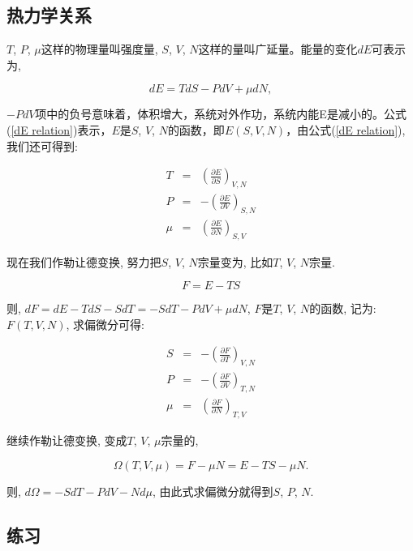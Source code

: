 \subsection{热力学关系}

$T$, $P$, $\mu$这样的物理量叫强度量, $S$, $V$, $N$这样的量叫广延量。能量的变化$dE$可表示为,

\begin{equation}\label{dE relation}
dE = TdS - P dV + \mu dN,
\end{equation}

$-PdV$项中的负号意味着，体积增大，系统对外作功，系统内能E是减小的。公式(\ref{dE relation})表示，$E$是$S$, $V$, $N$的函数，即$E(S, V, N)$，由公式(\ref{dE relation}), 我们还可得到:

\begin{eqnarray*}
  T &=& \left( \frac{\partial E}{\partial S} \right)_{V,N}  \\
  P &=& - \left(\frac{\partial E}{\partial V} \right)_{S,N} \\
  \mu &=& \left(\frac{\partial E}{\partial N} \right)_{S,V}
\end{eqnarray*}

现在我们作勒让德变换, 努力把$S$, $V$, $N$宗量变为, 比如$T$, $V$, $N$宗量.

\begin{equation*}
F = E - TS
\end{equation*}

则, $d F = d E - T dS - S dT = -S dT - P dV + \mu dN$, $F$是$T$, $V$, $N$的函数, 记为: $F(T, V, N)$, 求偏微分可得:

\begin{eqnarray*}
  S &=& - \left( \frac{\partial F}{\partial T} \right)_{V,N} \\
  P &=& - \left( \frac{\partial F}{\partial V} \right)_{T,N} \\
  \mu &=& \left( \frac{\partial F}{\partial N} \right)_{T,V}
\end{eqnarray*}

继续作勒让德变换, 变成$T$, $V$, $\mu$宗量的,

\begin{equation*}
\Omega(T,V,\mu) = F - \mu N = E - TS - \mu N.
\end{equation*}

则, $d \Omega = -S dT - P dV - N d\mu$, 由此式求偏微分就得到$S$, $P$, $N$.

\subsection*{练习}

